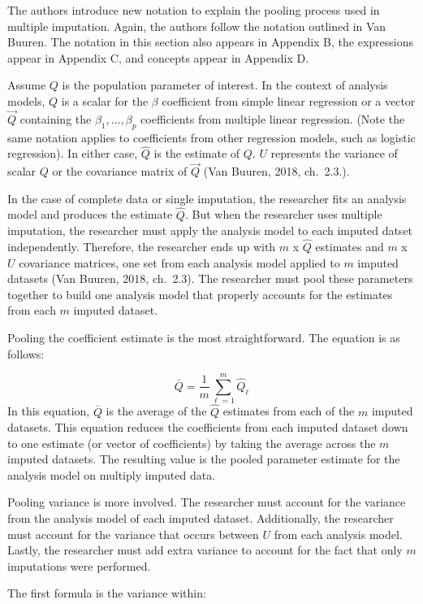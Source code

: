 \documentclass[12pt,oneside]{chicagocapstone}
\begin{document}
The authors introduce new notation to explain the pooling process used
in multiple imputation. Again, the authors follow the notation outlined
in Van Buuren. The notation in this section also appears in Appendix B,
the expressions appear in Appendix C, and concepts appear in Appendix D.

Assume \(Q\) is the population parameter of interest. In the context of
analysis models, \(Q\) is a scalar for the \(\beta\) coefficient from
simple linear regression or a vector \(\vec{Q}\) containing the
\(\beta_1,...,\beta_p\) coefficients from multiple linear regression.
(Note the same notation applies to coefficients from other regression
models, such as logistic regression). In either case, \(\hat{Q}\) is the
estimate of \(Q\). \(U\) represents the variance of scalar \(Q\) or the
covariance matrix of \(\vec{Q}\) (Van Buuren, 2018, ch.~2.3.).

In the case of complete data or single imputation, the researcher fits
an analysis model and produces the estimate \(\hat{Q}\). But when the
researcher uses multiple imputation, the researcher must apply the
analysis model to each imputed datset independently. Therefore, the
researcher ends up with \(m\) x \(\hat{Q}\) estimates and \(m\) x \(U\)
covariance matrices, one set from each analysis model applied to \(m\)
imputed datasets (Van Buuren, 2018, ch.~2.3). The researcher must pool
these parameters together to build one analysis model that properly
accounts for the estimates from each \(m\) imputed dataset.

Pooling the coefficient estimate is the most straightforward. The
equation is as follows:

\[\bar Q = \frac{1}{m}\sum_{\ell=1}^m \hat Q_\ell\] In this equation,
\(\bar Q\) is the average of the \(\hat Q\) estimates from each of the
\(m\) imputed datasets. This equation reduces the coefficients from each
imputed dataset down to one estimate (or vector of coefficients) by
taking the average across the \(m\) imputed datasets. The resulting
value is the pooled parameter estimate for the analysis model on
multiply imputed data.

Pooling variance is more involved. The researcher must account for the
variance from the analysis model of each imputed dataset. Additionally,
the researcher must account for the variance that occurs between \(U\)
from each analysis model. Lastly, the researcher must add extra variance
to account for the fact that only \(m\) imputations were performed.

The first formula is the variance within:
\end{document}
